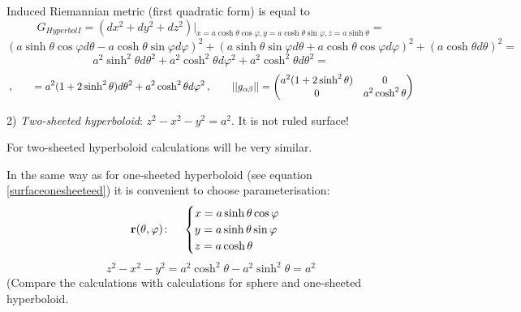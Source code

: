 \documentclass[12pt]{article}
\theoremstyle{theorem}
\numberwithin{equation}{section}
\begin{document}
Induced Riemannian metric (first quadratic form) is equal to
              $$
              G_{Hyperbol I}=\left(dx^2+dy^2+dz^2\right)\big\vert_{x=a\cosh\theta\cos\varphi,y=a\cosh\theta\sin\varphi,
              z=a\sinh\theta}=
                      $$
                      $$
                      (a\sinh\theta\cos\varphi d\theta-a\cosh\theta\sin\varphi d\varphi)^2+
                      (a\sinh\theta\sin\varphi d\theta+a\cosh\theta\cos\varphi d\varphi)^2+
                         (a\cosh\theta d\theta)^2=
                      $$
                      $$
          a^2\sinh^2\theta d\theta^2+a^2\cosh^2\theta d\varphi^2+a^2\cosh^2\theta d\theta^2=
                      $$
        \begin{equation*}\label{firtsquadraticformforsphere(diff)}\,,\qquad
             =a^2(1+2\sinh^2\theta) d\theta^2+a^2\cosh^2\theta d\varphi^2\,,\qquad
                        ||g_{\alpha\beta}||=
   \begin{pmatrix}
   a^2(1+2\sinh^2\theta) & 0 \\
   0&  a^2\cosh^2\theta \\
   \end{pmatrix}
                       \end{equation*}
 \m

2) {\sl Two-sheeted hyperboloid}: $z^2-x^2-y^2=a^2$. It is not ruled surface!

 For two-sheeted hyperboloid calculations will be very similar.


 In the same way as for one-sheeted hyperboloid (see equation \eqref{surfaceonesheeteed})
 it is convenient to
choose parameterisation:
\begin{equation}\label{surfacehyperbol2}
  {\bf r}(\theta,\varphi)\colon\quad
  \begin{cases}
  x=a\sinh\theta\cos\varphi\\
  y=a\sinh\theta\sin\varphi\\
  z=a\cosh\theta\\
  \end{cases}
\end{equation}
   $$
 z^2-x^2-y^2=a^2\cosh^2 \theta-a^2\sinh^2\theta=a^2
   $$
(Compare the calculations with calculations for sphere and one-sheeted hyperboloid.
\medskip
\end{document}
